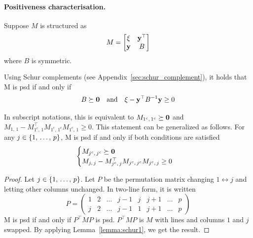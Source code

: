 \paragraph{Positiveness characterisation.}
Suppose $M$ is structured as
\begin{equation*}
    M = \begin{bmatrix}
        \xi & \mathbf{y}^\top\\
        \mathbf{y} & B
    \end{bmatrix}
\end{equation*}
where $B$ is symmetric.
\begin{lemma}\label{lemma:schur1}
    Using Schur complements (see Appendix~\ref{sec:schur_complement}), it holds that M is psd if and only if
    \begin{equation*}
        B \succeq \mathbf{0}
        \quad\text{and}\quad
        \xi - \mathbf{y}^\top B^{-1} \mathbf{y} \geq 0
    \end{equation*}
\end{lemma}
In subscript notations, this is equivalent to $M_{1^c,\, 1^c} \succeq \mathbf{0}$ and
$M_{1,\, 1} - M_{1^c,\, 1}^\top M_{1^c,\, 1^c} M_{1^c,\, 1} \geq 0$.
This statement can be generalized as follows.
For any $j \in \left\{ 1,\, \dots,\, p \right\}$, M is psd if and only if both conditions are satisfied
\begin{equation}\label{eq:psd_schur_permutation}
    \begin{cases}
        M_{j^c,\, j^c} \succeq \mathbf{0}\\
        M_{j,\, j} - M_{j^c,\, j}^\top M_{j^c,\, j^c} M_{j^c,\, j} \geq 0
    \end{cases}
\end{equation}
\begin{proof}
    Let $j \in \left\{ 1,\, \dots,\, p \right\}$.
    Let $P$ be the permutation matrix changing $1 \leftrightarrow j$ and letting other columns unchanged.
    In two-line form, it is written
    \begin{equation*}
        P = \begin{pmatrix}
                1 & 2 & \dots & j - 1 & j & j + 1 & \dots & p\\
                j & 2 & \dots & j - 1 & 1 & j + 1 & \dots & p
        \end{pmatrix}
    \end{equation*}
    M is psd if and only if $P^\top M P$ is psd.
    $P^\top M P$ is $M$ with lines and columns $1$ and $j$ swapped.
    By applying Lemma~\ref{lemma:schur1}, we get the result.
\end{proof}


